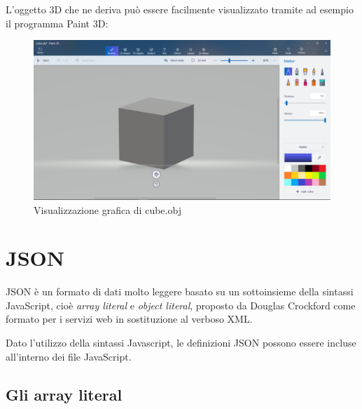 \newpage
L'oggetto 3D che ne deriva può essere facilmente visualizzato tramite ad esempio il programma Paint 3D:

\begin{figure}[h]
	\centering
	\includegraphics[scale=0.35]{Immagini/cube_obj.png}
	\caption{Visualizzazione grafica di cube.obj}
\end{figure}

\section{JSON}
JSON è un formato di dati molto leggere basato su un sottoinsieme della sintassi JavaScript, cioè \emph{array literal} e \emph{object literal}, proposto da Douglas Crockford come formato per i servizi web in sostituzione al verboso XML.

Dato l'utilizzo della sintassi Javascript, le definizioni JSON possono essere incluse all'interno dei file JavaScript.
\subsection{Gli array literal}

